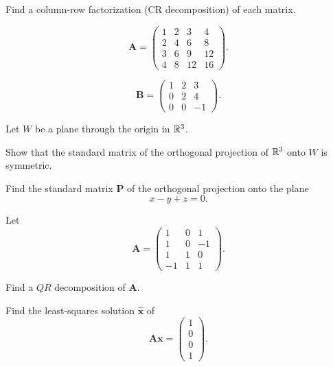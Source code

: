 \begin{problem}
Find a column-row factorization (CR decomposition) of each matrix.
\begin{problemsubparts}
\item
\[
\mathbf A=
\begin{pmatrix}
1&2&3&4\\
2&4&6&8\\
3&6&9&12\\
4&8&12&16
\end{pmatrix}.
\]
\item
\[
\mathbf B=
\begin{pmatrix}
1&2&3\\
0&2&4\\
0&0&-1
\end{pmatrix}.
\]
\end{problemsubparts}
\end{problem}

\begin{problem}
Let $W$ be a plane through the origin in $\mathbb{R}^3$.
\begin{problemsubparts}
\item Show that the standard matrix of the orthogonal projection of $\mathbb{R}^3$ onto $W$ is symmetric.
\item Find the standard matrix $\mathbf P$ of the orthogonal projection onto the plane
\[
x-y+z=0.
\]
\end{problemsubparts}
\end{problem}

\begin{problem}
Let
\[
\mathbf A=
\begin{pmatrix}
1&0&1\\
1&0&-1\\
1&1&0\\
-1&1&1
\end{pmatrix}.
\]
\begin{problemsubparts}
\item Find a $QR$ decomposition of $\mathbf A$.
\item Find the least-squares solution $\widehat{\mathbf x}$ of
\[
\mathbf A\mathbf x=
\begin{pmatrix}
1\\0\\0\\1
\end{pmatrix}.
\]
\end{problemsubparts}
\end{problem}

